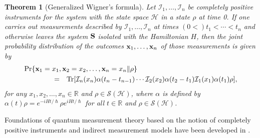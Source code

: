 \documentclass[graybox]{svmult}
\newcommand{\beqa}{\begin{eqnarray}}
\newcommand{\eeqa}{\end{eqnarray}}
\newcommand{\bS}{{\bf S}}
\newcommand{\cH}{{\mathcal H}}
\newcommand{\cI}{{\mathcal I}}
\newcommand{\cS}{{\mathcal S}}
\newcommand{\al}{\alpha}
\newcommand{\nn}{\nonumber}
\newcommand{\rh}{\rho}
\newcommand{\Tr}{\mbox{\rm Tr}}
\newcommand{\bx}{{\bf x}}
\newtheorem{Theorem}{Theorem}
\newcommand{\R}{\mathbb{R}}
\begin{document}
\begin{Theorem}[Generalized Wigner's formula]
Let $\cI_{1},\ldots,\cI_{n}$ be completely positive 
instruments for the system with
the state space $\cH$  in a state $\rh$ at time 0.
If one carries out measurements described by $\cI_{1},\ldots,\cI_{n}$  
at times $(0<)t_{1}<\cdots<t_{n}$ and otherwise leaves the system $\bS$ isolated
with the Hamiltonian $H$,
then the joint probability distribution of the outcomes 
$\bx_{1},\ldots,\bx_{n}$ of those measurements is given by
\beqa
\lefteqn{\Pr\{\bx_{1}=x_1,\bx_{2}=x_2,\ldots,\bx_{n}=x_n\|\rh\}}
\qquad\qquad\nn\\
&=&
\Tr[\cI_{n}(x_{n})\al(t_{n}-t_{n-1})\cdots
\cI_{2}(x_2)\al(t_{2}-t_{1})\cI_{1}(x_1)\al(t_{1})\rh],
\eeqa
for any $x_1,x_2,\ldots,x_n\in\R$ and $\rh\in\cS(\cH)$,
where $\al$ is defined by 
$\al(t)\rh=e^{-iHt/\hslash}\rh e^{iHt/\hslash}$ for all 
$t\in\R$ and $\rh\in\cS(\cH)$. 
\end{Theorem}

Foundations of quantum measurement theory
based on the notion of completely positive instruments and indirect measurement models 
have been developed in  
\cite{83CR,84QC,85CA,85CC,86IQ,88MR,88MS,89RS,90QP,91QU,93CA,95MM,97QQ,97OQ,%
98QS,00MN,01OD,04URN,05PCN,06QPC,19A1}.
 
\end{document}
